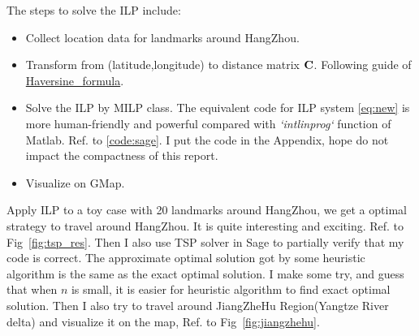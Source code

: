 \documentclass{mcmthesis}
\begin{document}
The steps to solve the ILP include: 
\begin{itemize}[noitemsep,nolistsep]
	\item Collect location data for landmarks around HangZhou. 
	\item Transform from (latitude,longitude)  to distance matrix $\mathbf{C}$. Following guide of \href{https://en.wikipedia.org/wiki/Haversine_formula}{Haversine\_formula}. 
	\item Solve the ILP by MILP class. The equivalent code for ILP system \eqref{eq:new} is more human-friendly and powerful compared with \textit{`intlinprog`} function of Matlab.  Ref. to \vref{code:sage}. I put the code in the Appendix, hope do not impact the compactness of this report.
	\item Visualize on GMap. 
\end{itemize}
%

Apply ILP to a toy case with 20 landmarks around HangZhou, we get a optimal strategy to travel around HangZhou. It is quite interesting and exciting. Ref. to Fig~\vref{fig:tsp_res}. Then I also use TSP solver in Sage to partially verify that my code is correct. The approximate optimal solution got by some heuristic algorithm is the same as the exact optimal solution. I make some try, and guess that when $n$ is small, it is easier for heuristic algorithm to find exact optimal solution.  Then I also try to travel around JiangZheHu Region(Yangtze River delta) and visualize it on the map, Ref. to Fig~\vref{fig:jiangzhehu}. 
\end{document}
